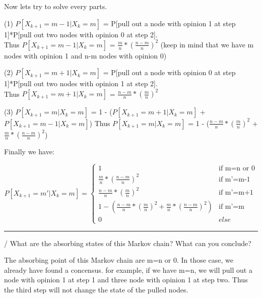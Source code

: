 \documentclass[11pt]{article}
\begin{document}
\vspace{5mm}

\noindent Now lets try to solve every parts.

(1) $P[X_{k+1} = m-1|X_{k} = m]$ = P[pull out a node with opinion 1 at step 1]*P[pull out two nodes with opinion 0 at step 2]. \\
Thus $P[X_{k+1} = m-1|X_{k} = m]$ = $\frac{m}{n}*(\frac{n-m}{n})^{2}$ (keep in mind that we have m nodes with opinion 1 and n-m nodes with opinion 0)

(2) $P[X_{k+1} = m+1|X_{k} = m]$ = P[pull out a node with opinion 0 at step 1]*P[pull out two nodes with opinion 1 at step 2]. \\
Thus $P[X_{k+1} = m+1|X_{k} = m]$ = $\frac{n-m}{n}*(\frac{m}{n})^{2}$

(3) $P[X_{k+1} = m|X_{k} = m]$ = 1 - ($P[X_{k+1} = m+1|X_{k} = m]$ + $P[X_{k+1} = m-1|X_{k} = m]$)
Thus $P[X_{k+1} = m|X_{k} = m]$ = 1 - ($\frac{n-m}{n}*(\frac{m}{n})^{2}$ + $\frac{m}{n}*(\frac{n-m}{n})^{2}$)

\vspace{5mm}

\noindent Finally we have: 

\begin{equation}
    P[X_{k+1} = m'|X_{k} = m]=
    \begin{cases}
        1 & \text{if m=n or 0}\\
        \frac{m}{n}*(\frac{n-m}{n})^{2} & \text{if m'=m-1}\\
        \frac{n-m}{n}*(\frac{m}{n})^{2} & \text{if m'=m+1}\\
        1 - (\frac{n-m}{n}*(\frac{m}{n})^{2} + \frac{m}{n}*(\frac{n-m}{n})^{2}) & \text{if m'=m}\\
        0 & else

    \end{cases}
\end{equation}


\begin{center}
    \noindent\rule{8cm}{0.4pt} 
\end{center}

\vspace{5mm}

/ What are the absorbing states of this Markov chain? What can you conclude?

\vspace{5mm}

\noindent The absorbing point of this Markov chain are m=n or 0. In those case, we already have found a concensus. for example, if we have m=n, we will pull out a node with opinion 1 at step 1 and three node with opinion 1 at step two. Thus the third step will not change the state of the pulled nodes.
\end{document}
